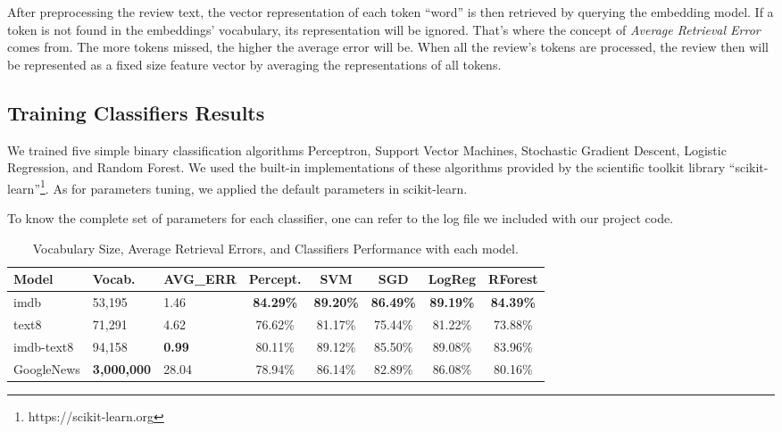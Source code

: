 \documentclass[11pt,letterpaper]{article}
\begin{document}
After preprocessing the review text, the vector representation of each
token ``word'' is then retrieved by querying the embedding model. If a
token is not found in the embeddings' vocabulary, its representation
will be ignored. That's where the concept of \emph{Average Retrieval
Error} comes from. The more tokens missed, the higher the average error
will be. When all the review's tokens are processed, the review then
will be represented as a fixed size feature vector by averaging the
representations of all tokens.

\subsection{Training Classifiers
Results}\label{training-classifiers-results}

We trained five simple binary classification algorithms Perceptron,
Support Vector Machines, Stochastic Gradient Descent, Logistic
Regression, and Random Forest. We used the built-in implementations of
these algorithms provided by the scientific toolkit library
``scikit-learn''\footnote{https://scikit-learn.org}. As for parameters
tuning, we applied the default parameters in scikit-learn.

To know the complete set of parameters for each classifier, one can
refer to the log file we included with our project code.

\begin{table}[ht]
\centering
\footnotesize

\begin{tabular}{@{}l||l||l||ccccc@{}}
\toprule

Model & Vocab. & AVG\_ERR & Percept. & SVM & SGD & LogReg & RForest \\\midrule

imdb & 53,195 & 1.46 & \textbf{84.29\%} & \textbf{89.20\%} & \textbf{86.49\%} & \textbf{89.19\%} & \textbf{84.39\%} \\
text8 & 71,291 & 4.62 & 76.62\% & 81.17\% & 75.44\% & 81.22\% & 73.88\% \\
imdb-text8 & 94,158 & \textbf{0.99} & 80.11\% & 89.12\% & 85.50\% & 89.08\% & 83.96\% \\
GoogleNews & \textbf{3,000,000} & 28.04 & 78.94\% & 86.14\% & 82.89\% & 86.08\% & 80.16\% \\

\bottomrule
\end{tabular}

\caption{Vocabulary Size, Average Retrieval Errors, and Classifiers
Performance with each model. \label{tbl:classifiers_acc}}

\end{table}
\end{document}
